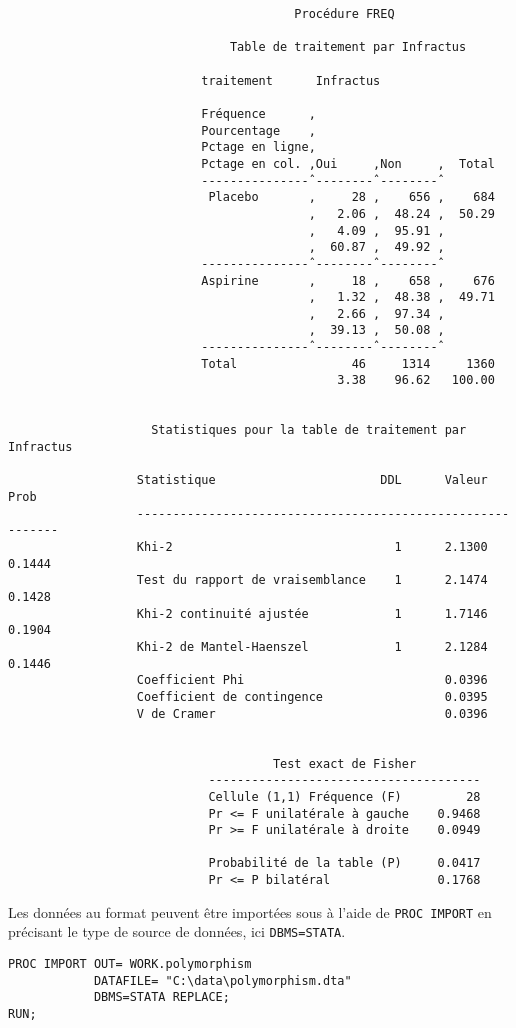 \begin{verbatim}
                                        Procédure FREQ

                               Table de traitement par Infractus

                           traitement      Infractus

                           Fréquence      ‚
                           Pourcentage    ‚
                           Pctage en ligne‚
                           Pctage en col. ‚Oui     ‚Non     ‚  Total
                           ---------------ˆ--------ˆ--------ˆ
                            Placebo       ‚     28 ‚    656 ‚    684
                                          ‚   2.06 ‚  48.24 ‚  50.29
                                          ‚   4.09 ‚  95.91 ‚
                                          ‚  60.87 ‚  49.92 ‚
                           ---------------ˆ--------ˆ--------ˆ
                           Aspirine       ‚     18 ‚    658 ‚    676
                                          ‚   1.32 ‚  48.38 ‚  49.71
                                          ‚   2.66 ‚  97.34 ‚
                                          ‚  39.13 ‚  50.08 ‚
                           ---------------ˆ--------ˆ--------ˆ
                           Total                46     1314     1360
                                              3.38    96.62   100.00


                    Statistiques pour la table de traitement par Infractus

                  Statistique                       DDL      Valeur      Prob
                  -----------------------------------------------------------
                  Khi-2                               1      2.1300    0.1444
                  Test du rapport de vraisemblance    1      2.1474    0.1428
                  Khi-2 continuité ajustée            1      1.7146    0.1904
                  Khi-2 de Mantel-Haenszel            1      2.1284    0.1446
                  Coefficient Phi                            0.0396
                  Coefficient de contingence                 0.0395
                  V de Cramer                                0.0396


                                     Test exact de Fisher
                            --------------------------------------
                            Cellule (1,1) Fréquence (F)         28
                            Pr <= F unilatérale à gauche    0.9468
                            Pr >= F unilatérale à droite    0.0949

                            Probabilité de la table (P)     0.0417
                            Pr <= P bilatéral               0.1768
\end{verbatim}
%
%
%
\soln{\ref{exo:9.5}}
Les données au format \Stata peuvent être importées sous \SAS à l'aide de
\texttt{PROC IMPORT} en précisant le type de source de données, ici
\texttt{DBMS=STATA}.
\begin{verbatim}
PROC IMPORT OUT= WORK.polymorphism
            DATAFILE= "C:\data\polymorphism.dta"
            DBMS=STATA REPLACE;
RUN;
\end{verbatim}


